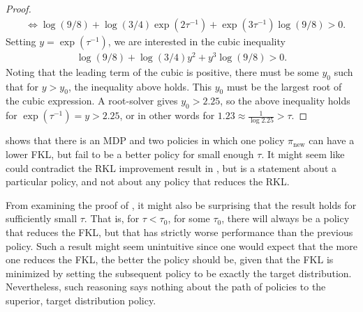 \documentclass[twoside,11pt]{article}
\newcommand{\pinew}{{\pi_\mathrm{new}}}
\begin{document}
\begin{proof}
\begin{align*}
    &\iff \log(9/8) + \log(3/4)\exp(2 \tau^{-1}) + \exp(3\tau^{-1})\log(9/8) > 0.
\end{align*}
Setting $y = \exp(\tau^{-1})$, we are interested in the cubic inequality
\begin{align*}
    \log(9/8) + \log(3/4) y^2 + y^3\log(9/8) > 0.
\end{align*}
Noting that the leading term of the cubic is positive, there must be some $y_0$ such that for $y > y_0$, the inequality above holds. This $y_0$ must be the largest root of the cubic expression. A root-solver gives $y_0 > 2.25$, so the above inequality holds for $\exp(\tau^{-1}) = y > 2.25$, or in other words for $1.23 \approx \frac{1}{\log 2.25} > \tau$.

\end{proof}
%
 shows that there is an MDP and two policies in which one policy $\pinew$ can have a lower FKL, but fail to be a better policy for small enough $\tau$. It might seem like  could contradict the RKL improvement result in , but  is a statement about a particular policy, and not about any policy that reduces the RKL.

From examining the proof of , it might also be surprising that the result holds for sufficiently small $\tau$. That is, for $\tau < \tau_0$, for some $\tau_0$, there will always be a policy that reduces the FKL, but that has strictly worse performance than the previous policy. Such a result might seem unintuitive since one would expect that the more one reduces the FKL, the better the policy should be, given that the FKL is minimized by setting the subsequent policy to be exactly the target distribution. Nevertheless, such reasoning says nothing about the path of policies to the superior, target distribution policy. 
\end{document}
